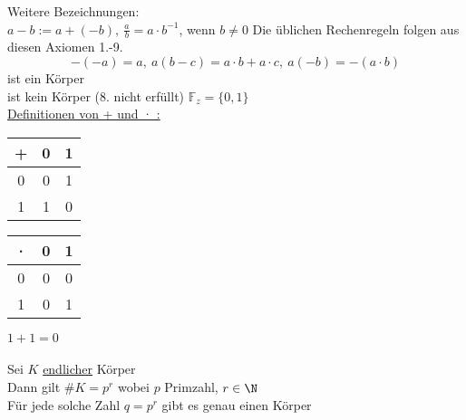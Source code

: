 Weitere Bezeichnungen:\\
$a-b:=a+(-b),\ \frac{a}{b}=a·b^{-1}$, wenn $b≠0$
\bem
Die üblichen Rechenregeln folgen aus diesen Axiomen 1.-9.
\bsp
$$-(-a)=a,\ a(b-c)=a·b+a·c,\ a(-b)=-(a·b)$$
%
\Q ist ein Körper\\
\Z ist kein Körper (8. nicht erfüllt)
%
$\mathbb{F}_z=\{0,1\}$\\
\underline{Definitionen von + und · :}\\[8pt]
\parbox{.2\textwidth}{\begin{tabular}{c|cc}
+&0&1\\[2pt]\hline
0&0&1\\[2pt]
1&1&0
\end{tabular}}
\parbox{.2\textwidth}{\begin{tabular}{c|cc}
·&0&1\\[2pt]\hline
0&0&0\\[2pt]
1&0&1
\end{tabular}}
$1+1=0$\\[4pt]
\\
\bem
Sei $K$ \underline{endlicher} Körper\\
Dann gilt $\#K=p^r$ wobei $p$ Primzahl, $r\in\N$\\
Für jede solche Zahl $q=p^r$ gibt es genau einen Körper
